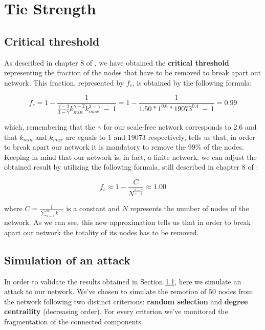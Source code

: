 \chapter{Tie Strength} %
\label{cha:tie_strength}
    \section{Critical threshold} %
    \label{sec:critical_threshold}
        As described in chapter 8 of \cite{network_science}, we have obtained the \textbf{critical threshold}
        representing the fraction of the nodes that have to be removed to break apart out network. This fraction,
        represented by $f_c$, is obtained by the following formula:

        \begin{equation*}
            f_c = 1 - \frac{1}
            {\frac{\gamma - 2}{3 - \gamma}k^{\gamma - 2}_{\mathit{min}}k^{3 - \gamma}_{\mathit{max}} \ - \  1} =
            1 - \frac{1}{1.50 * 1^{0.6} * 19073^{0.4} \ - \ 1} = 0.99
        \end{equation*}

        which, remembering that the $\gamma$ for our scale-free network corresponds to $2.6$ and that
        $k_{\mathit{min}}$ and $k_{\mathit{max}}$ are eguals to $1$ and $19073$ respectively, tells us that, in
        order to break apart our network it is mandatory to remove the $99\%$ of the nodes. Keeping in mind that
        our network is, in fact, a finite network, we can adjust the obtained result by utilizing the following
        formula, still described in chapter 8 of \cite{network_science}:

        \begin{equation*}
            f_c \approx 1 - \frac{C}{N^{\frac{3 - \gamma}{\gamma - 1}}} \approx 1.00
        \end{equation*}

        where $C = \frac{1}{\sum_{k=1}^{\infty}k^{-\gamma}}$ is a constant and $N$ represents the number of nodes
        of the network. As we can see, this new approximation tells us that in order to break apart our network the
        totality of its nodes has to be removed.
    \section{Simulation of an attack} %
    \label{sec:simulation_of_an_attack}
        In order to validate the results obtained in Section \ref{sec:critical_threshold}, here we simulate an
        attack to our network. We've chosen to simulate the remotion of $50$ nodes from the network following two
        distinct criterions: \textbf{random selection} and \textbf{degree centraility} (decreasing order). For every
        criterion we've monitored the fragmentation of the connected components.

